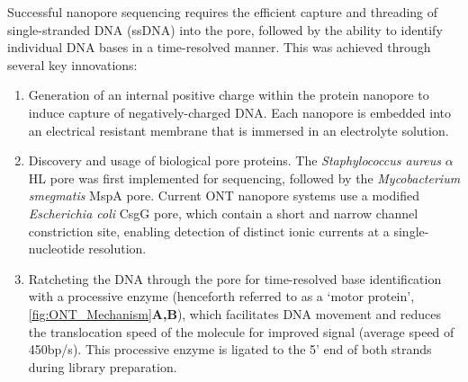 Successful nanopore sequencing requires the efficient capture and threading of single-stranded DNA (ssDNA) into the pore, followed by the ability to identify individual DNA bases in a time-resolved manner. This was achieved through several key innovations\cite{Bayley2015}: 
\begin{enumerate}
	\item Generation of an internal positive charge within the protein nanopore to induce capture of negatively-charged DNA. Each nanopore is embedded into an electrical resistant membrane that is immersed in an electrolyte solution.
	\item Discovery and usage of biological pore proteins. The \textit{Staphylococcus aureus} \textit{$\alpha$}HL pore was first implemented for sequencing\cite{N2005}, followed by the \textit{Mycobacterium smegmatis} MspA pore\cite{Manrao2011}. Current ONT nanopore systems use a modified \textit{Escherichia coli} CsgG pore, which contain a short and narrow channel constriction site, enabling detection of distinct ionic currents at a single-nucleotide resolution. 
	\item Ratcheting the DNA through the pore for time-resolved base identification with a processive enzyme (henceforth referred to as a ‘motor protein', \cref{fig:ONT_Mechanism}\textbf{A,B}), which facilitates DNA movement and reduces the translocation speed of the molecule for improved signal (average speed of 450bp/s)\cite{Rang2018}. This processive enzyme is ligated to the 5' end of both strands during library preparation.   
\end{enumerate}


